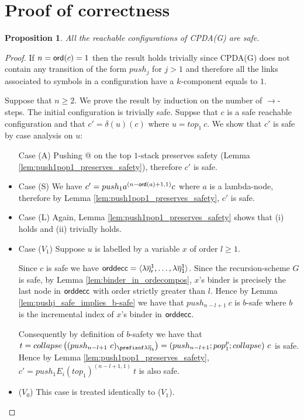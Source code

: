 \documentclass{article}
\newtheorem{proposition}{Proposition}[section]
\theoremstyle{remark}
\theoremstyle{definition}
\newcommand\orddec{\sf orddec}
\begin{document}
\section{Proof of correctness}

\begin{proposition}
All the reachable configurations of CPDA(G) are safe.
\end{proposition}
\begin{proof}
If $n ={\sf ord}(c) =1$ then the result holds trivially since CPDA(G) does not contain
any transition of the form $push_j$ for $j>1$ and therefore all the links associated to symbols in a configuration have a $k$-component equals to $1$.

Suppose that $n\geq 2$. We prove the result by induction on the number of
$\rightarrow$-steps. The initial configuration is trivially safe.
Suppse that $c$ is a safe reachable configuration and that
$c'=\delta(u)(c)$ where $u = top_1\ c$.
We show that $c'$ is safe by case analysis on $u$:
\begin{itemize}
\item[Case (A)] Pushing @ on the top $1$-stack preserves safety (Lemma
\ref{lem:push1pop1_preserves_safety}), therefore $c'$ is safe.

\item Case (S)
We have $c' = push_1 a^{(n-{\sf ord}(a)+1,1)} c$ where $a$ is a
lambda-node, therefore by Lemma \ref{lem:push1pop1_preserves_safety},
$c'$ is safe.

\item Case (L) Again, Lemma \ref{lem:push1pop1_preserves_safety}
shows that (i) holds and (ii) trivially holds.

\item Case ($V_1$) Suppose $u$ is labelled by a variable $x$ of order $l\geq 1$.

Since $c$ is safe we have $\orddec{c} = \langle \lambda
\overline{\eta}_r^1 , \ldots, \lambda \overline{\eta}_1^1
\rangle$.
Since the recursion-scheme $G$ is safe, by Lemma \ref{lem:binder_in_ordecompos}, $x$'s binder is precisely the
last node in $\orddec{c}$ with order strictly greater than $l$.
Hence by Lemma \ref{lem:pushj_safe_implies_b-safe}
we have that $push_{n-l+1}\ c$ is $b$-safe where $b$ is the
incremental index of $x$'s binder in $\orddec{c}$.

Consequently by definition of $b$-safety we have that
$t = collapse \left( (push_{n-l+1}~ c)_{\prefixof \lambda
\overline{\eta}_{b}} \right) = (push_{n-l+1};pop_1^p;collapse)
~c$ is safe. Hence by
Lemma \ref{lem:push1pop1_preserves_safety}, $c' = push_1 E_i(top_1)^{(n-l+1,1)}\ t$ is also safe.

\item ($V_0$) This case is treated identically to ($V_1$).
\end{itemize}
\end{proof}
\end{document}
